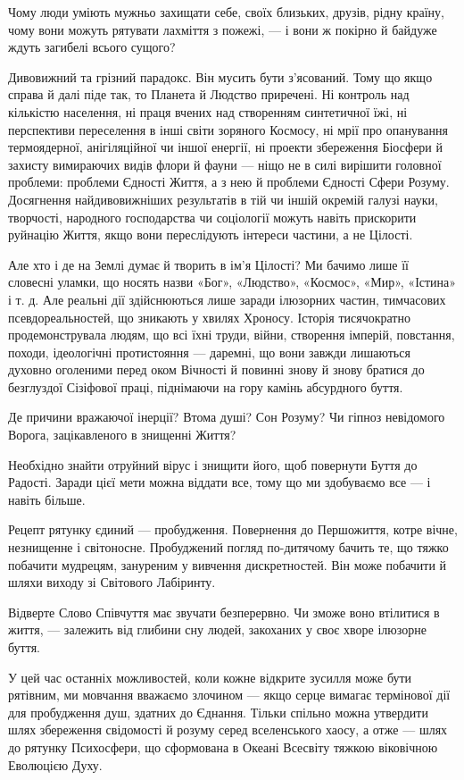 Чому люди уміють мужньо захищати себе, своїх близьких, друзів, рідну країну,
чому вони можуть рятувати лахміття з пожежі, — і вони ж покірно й байдуже ждуть
загибелі всього сущого?

Дивовижний та грізний парадокс. Він мусить бути з’ясований. Тому що якщо справа
й далі піде так, то Планета й Людство приречені. Ні контроль над кількістю
населення, ні праця вчених над створенням синтетичної їжі, ні перспективи
переселення в інші світи зоряного Космосу, ні мрії про опанування термоядерної,
анігіляційної чи іншої енергії, ні проекти збереження Біосфери й захисту
вимираючих видів флори й фауни — ніщо не в силі вирішити головної проблеми:
проблеми Єдності Життя, а з нею й проблеми Єдності Сфери Розуму. Досягнення
найдивовижніших результатів в тій чи іншій окремій галузі науки, творчості,
народного господарства чи соціології можуть навіть прискорити руйнацію Життя,
якщо вони переслідують інтереси частини, а не Цілості.

Але хто і де на Землі думає й творить в ім’я Цілості? Ми бачимо лише її
словесні уламки, що носять назви «Бог», «Людство», «Космос», «Мир», «Істина» і
т. д. Але реальні дії здійснюються лише заради ілюзорних частин, тимчасових
псевдореальностей, що зникають у хвилях Хроносу. Історія тисячократно
продемонструвала людям, що всі їхні труди, війни, створення імперій, повстання,
походи, ідеологічні протистояння — даремні, що вони завжди лишаються духовно
оголеними перед оком Вічності й повинні знову й знову братися до безглуздої
Сізіфової праці, піднімаючи на гору камінь абсурдного буття.

Де причини вражаючої інерції? Втома душі? Сон Розуму? Чи гіпноз невідомого
Ворога, зацікавленого в знищенні Життя?

Необхідно знайти отруйний вірус і знищити його, щоб повернути Буття до Радості.
Заради цієї мети можна віддати все, тому що ми здобуваємо все — і навіть
більше.

Рецепт рятунку єдиний — пробудження. Повернення до Першожиття, котре вічне,
незнищенне і світоносне. Пробуджений погляд по-дитячому бачить те, що тяжко
побачити мудрецям, зануреним у вивчення дискретностей. Він може побачити й
шляхи виходу зі Світового Лабіринту.

Відверте Слово Співчуття має звучати безперервно. Чи зможе воно втілитися в
життя, — залежить від глибини сну людей, закоханих у своє хворе ілюзорне буття.

У цей час останніх можливостей, коли кожне відкрите зусилля може бути рятівним,
ми мовчання вважаємо злочином — якщо серце вимагає термінової дії для
пробудження душ, здатних до Єднання. Тільки спільно можна утвердити шлях
збереження свідомості й розуму серед вселенського хаосу, а отже — шлях до
рятунку Психосфери, що сформована в Океані Всесвіту тяжкою віковічною Еволюцією
Духу.

